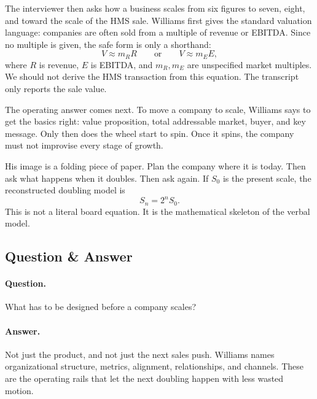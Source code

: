 The interviewer then asks how a business scales from six figures to seven, eight, and toward the scale of the HMS sale. Williams first gives the standard valuation language: companies are often sold from a multiple of revenue or EBITDA. Since no multiple is given, the safe form is only a shorthand:
\begin{equation}
V \approx m_R R
\qquad\text{or}\qquad
V \approx m_E E,
\end{equation}
where \(R\) is revenue, \(E\) is EBITDA, and \(m_R,m_E\) are unspecified market multiples. We should not derive the HMS transaction from this equation. The transcript only reports the sale value.

The operating answer comes next. To move a company to scale, Williams says to get the basics right: value proposition, total addressable market, buyer, and key message. Only then does the wheel start to spin. Once it spins, the company must not improvise every stage of growth.

His image is a folding piece of paper. Plan the company where it is today. Then ask what happens when it doubles. Then ask again. If \(S_0\) is the present scale, the reconstructed doubling model is
\begin{equation}
S_n = 2^nS_0.
\end{equation}
This is not a literal board equation. It is the mathematical skeleton of the verbal model.

\subsection{Question \& Answer}

\paragraph{Question.}
What has to be designed before a company scales?

\paragraph{Answer.}
Not just the product, and not just the next sales push. Williams names organizational structure, metrics, alignment, relationships, and channels. These are the operating rails that let the next doubling happen with less wasted motion.

